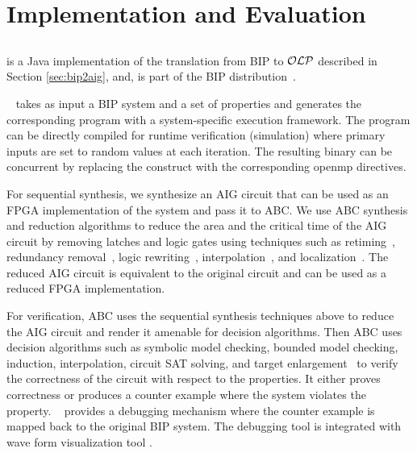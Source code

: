 \section{Implementation and Evaluation}
\label{sect-implem}

\subsection{\biptool{}} \label{chap:implementation:bip}
\biptool{} is a Java implementation of the translation from BIP to $\mathcal{OLP}$ described in Section \ref{sec:bip2aig}, and, is part of the BIP distribution~\cite{verimagbiponline}.

\biptool~ takes as input a BIP system and a set of properties 
and generates the corresponding \caig{} program with a system-specific 
execution framework. 
The \caig program can be directly compiled for runtime verification (simulation)
where primary inputs are set to random values at each iteration. 
The resulting binary can be concurrent by replacing the 
 construct with the corresponding openmp directives. 

For sequential synthesis, we synthesize an AIG 
circuit that can be used as an FPGA implementation of the system
and pass it to ABC. 
We use ABC synthesis and reduction algorithms to reduce the area and the critical
time of the AIG circuit by 
removing latches and logic gates using techniques such as 
retiming~\cite{KuBa01}, 
redundancy removal~\cite{HmBPK05,KuMP01,BjesseC00,aziz-fmsd-00}, 
logic rewriting~\cite{BjBo04}, interpolation~\cite{McMillan03}, 
and localization~\cite{Wang03}. 
The reduced AIG circuit is equivalent to the original circuit and can be used
as a reduced FPGA implementation. 


For verification, 
ABC uses the sequential synthesis techniques above to reduce the 
AIG circuit and render it amenable for decision algorithms. 
Then ABC uses decision algorithms such as 
symbolic model checking, bounded model checking, induction, 
interpolation, circuit SAT solving, 
and target enlargement~\cite{MoGS00,MoMZ01,HoSH00,BaKuAb02,Hari05expert}
to verify the correctness of the circuit with respect to the properties. 
It either proves correctness or produces a counter example where the system 
violates the property. 
\biptool~ provides a debugging mechanism where the counter example is mapped back 
to the original BIP system. 
The debugging tool is integrated with wave form visualization 
tool \cite{bybell2010gtkwave}.  

